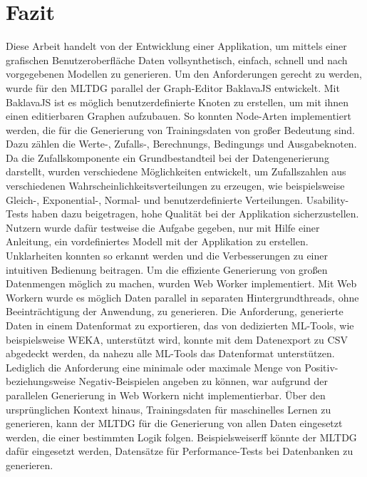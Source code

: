 
\chapter{Fazit}

Diese Arbeit handelt von der Entwicklung einer Applikation, um mittels einer grafischen Benutzeroberfläche Daten vollsynthetisch, einfach, schnell und nach vorgegebenen Modellen zu generieren. Um den Anforderungen gerecht zu werden, wurde für den \ac{MLTDG} parallel der Graph-Editor BaklavaJS entwickelt. Mit BaklavaJS ist es möglich benutzerdefinierte Knoten zu erstellen, um mit ihnen einen editierbaren Graphen aufzubauen. So konnten Node-Arten implementiert werden, die für die Generierung von Trainingsdaten von großer Bedeutung sind. Dazu zählen die Werte-, Zufalls-, Berechnungs, Bedingungs und Ausgabeknoten. Da die Zufallskomponente ein Grundbestandteil bei der Datengenerierung darstellt, wurden verschiedene Möglichkeiten entwickelt, um Zufallszahlen aus verschiedenen Wahrscheinlichkeitsverteilungen zu erzeugen, wie beispielsweise Gleich-, Exponential-, Normal- und benutzerdefinierte Verteilungen. Usability-Tests haben dazu beigetragen, hohe Qualität bei der Applikation sicherzustellen. Nutzern wurde dafür testweise die Aufgabe gegeben, nur mit Hilfe einer Anleitung, ein vordefiniertes Modell mit der Applikation zu erstellen. Unklarheiten konnten so erkannt werden und die Verbesserungen zu einer intuitiven Bedienung beitragen. Um die effiziente Generierung von großen Datenmengen möglich zu machen, wurden Web Worker implementiert. Mit Web Workern wurde es möglich Daten parallel in separaten Hintergrundthreads, ohne Beeinträchtigung der Anwendung, zu generieren. Die Anforderung, generierte Daten in einem Datenformat zu exportieren, das von dedizierten \ac{ML}-Tools, wie beispielsweise WEKA, unterstützt wird, konnte mit dem Datenexport zu \ac{CSV} abgedeckt werden, da nahezu alle \ac{ML}-Tools das Datenformat unterstützen. Lediglich die Anforderung eine minimale oder maximale Menge von Positiv- beziehungsweise Negativ-Beispielen angeben zu können, war aufgrund der parallelen Generierung in Web Workern nicht implementierbar. Über den ursprünglichen Kontext hinaus, Trainingsdaten für maschinelles Lernen zu generieren, kann der \ac{MLTDG} für die Generierung von allen Daten eingesetzt werden, die einer bestimmten Logik folgen. Beispielsweiserff könnte der \ac{MLTDG} dafür eingesetzt werden, Datensätze für Performance-Tests bei Datenbanken zu generieren.
